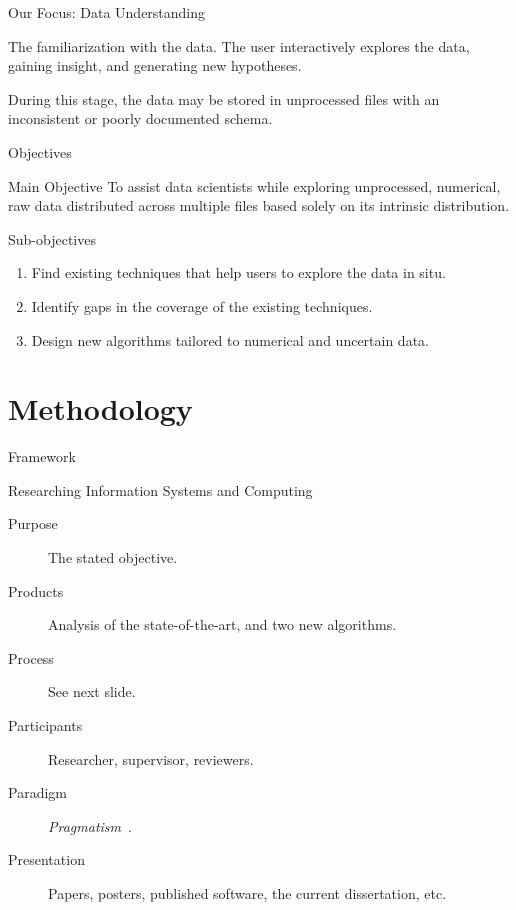 \documentclass[10pt]{beamer}
\begin{document}
\begin{frame}{Our Focus: Data Understanding}

The \alert{familiarization with the data}. The user interactively explores the
data, gaining insight, and generating new hypotheses.

During this stage, the data may be stored in unprocessed files with an
inconsistent or poorly documented schema.

\end{frame}

\begin{frame}{Objectives}
\begin{alertblock}{Main Objective}
    \smallskip
    To assist data scientists while exploring unprocessed, numerical, raw data distributed across multiple
    files based solely on its intrinsic distribution.
\end{alertblock}

\begin{block}{Sub-objectives}
    \begin{enumerate}
        \item Find existing techniques that help users to explore the data in situ.
        \item Identify gaps in the coverage of the existing techniques.
        \item Design new algorithms tailored to numerical and uncertain data.
    \end{enumerate}
\end{block}
\end{frame}



\section{Methodology}

\begin{frame}{Framework}
\begin{block}{\alert{Researching Information Systems and Computing}~\cite{Oates2006}}

\begin{description}
    \item[Purpose] The stated objective.
    \item[Products] Analysis of the state-of-the-art, and two new algorithms.
    \item[Process] See next slide.
    \item[Participants] Researcher, supervisor, reviewers.
    \item[Paradigm] \emph{Pragmatism}~\cite{Shull2008}.
    \item[Presentation] Papers, posters, published software, the current dissertation, etc.
\end{description}

\end{block}
\end{frame}
\end{document}
